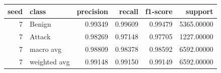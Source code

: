 \begin{tabular}{rlrrrr}
\toprule
seed & class & precision & recall & f1-score & support \\
\midrule
7 & Benign & 0.99349 & 0.99609 & 0.99479 & 5365.00000 \\
7 & Attack & 0.98269 & 0.97148 & 0.97705 & 1227.00000 \\
7 & macro avg & 0.98809 & 0.98378 & 0.98592 & 6592.00000 \\
7 & weighted avg & 0.99148 & 0.99150 & 0.99149 & 6592.00000 \\
\bottomrule
\end{tabular}
